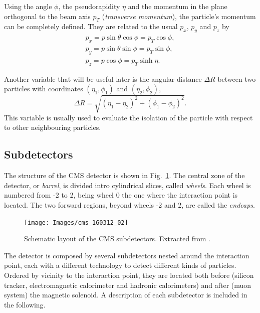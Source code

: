 \documentclass[../main.tex]{subfiles}
\begin{document}
Using the angle $\phi$, the pseudorapidity $\eta$ and the momentum in the plane orthogonal to the beam axis $p_T$ (\textit{transverse momentum}), the particle's momentum can be completely defined. They are related to the usual $p_x$, $p_y$ and $p_z$ by
\begin{align}
p_x = p\sin\theta\cos\phi = p_T \cos\phi, \\
p_y = p\sin\theta\sin\phi = p_T \sin\phi, \\
p_z = p\cos\phi = p_T \sinh \eta.
\end{align}

Another variable that will be useful later is the angular distance $\Delta R$ between two particles with coordinates $(\eta_1, \phi_1)$ and $(\eta_2, \phi_2)$,
\begin{equation}
\Delta R = \sqrt{(\eta_1 - \eta_2)^2 + (\phi_1 - \phi_2)^2}.
\end{equation}
This variable is usually used to evaluate the isolation of the particle with respect to other neighbouring particles.


\subsection{Subdetectors}

The structure of the CMS detector is shown in Fig.~\ref{intro:fig:subdetectors}. The central zone of the detector, or \textit{barrel}, is divided intro cylindrical slices, called \textit{wheels}. Each wheel is numbered from -2 to 2, being wheel 0 the one where the interaction point is located. The two forward regions, beyond wheels -2 and 2, are called the \textit{endcaps}.


\begin{figure}[h!]
\begin{center}
\texttt{[image: Images/cms\_160312\_02]}
\end{center}
\caption{Schematic layout of the CMS subdetectors. Extracted from \cite{intro:exp:subdetectors}.}
\label{intro:fig:subdetectors}
\end{figure}

The detector is composed by several subdetectors nested around the interaction point, each with a different technology to detect different kinds of particles. Ordered by vicinity to the interaction point, they are located both before (silicon tracker, electromagnetic calorimeter and hadronic calorimeters) and after (muon system) the magnetic solenoid. A description of each subdetector is included in the following.
\end{document}
